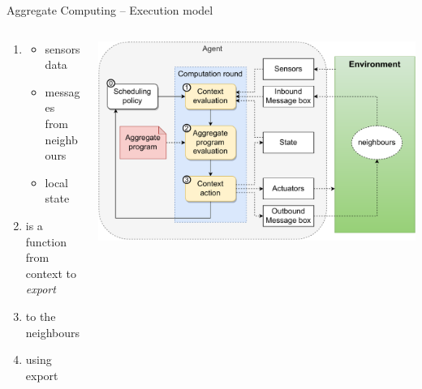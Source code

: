 \documentclass[9pt, aspectratio=169, handout]{beamer}
\begin{document}
\begin{frame}{Aggregate Computing -- Execution model}
  \begin{columns}
    \begin{column}{0.49\textwidth}
      \begin{card}
        \begin{enumerate}
          \item {}
          \begin{itemize}
            \item sensors data
            \item messages from neighbours
            \item local state
          \end{itemize}
          \item {} is a function from context to \emph{export}
          \item {} to the neighbours
          \item {} using export
        \end{enumerate}
      \end{card}
    \end{column}
    \begin{column}{0.51\textwidth}  
      \begin{cardTiny}
        \includegraphics[width=\textwidth]{img/aggregate-agent-control-architecture.drawio.pdf}    
      \end{cardTiny}
    \end{column}
  \end{columns}
\end{frame}
\end{document}
